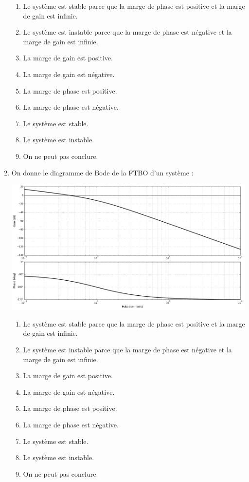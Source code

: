 \documentclass[10pt,fleqn]{article} %
\begin{document}
\begin{multicols}{2}
\begin{enumerate}
\begin{center}
\end{center}
\begin{enumerate}
\item Le système est stable parce que la marge de phase est positive et la marge de gain est infinie.
\item Le système est instable parce que la marge de phase est négative et la marge de gain est infinie.
\item La marge de gain est positive.
\item La marge de gain est négative.
\item La marge de phase est positive.
\item La marge de phase est négative.
\item Le système est stable.
\item Le système est instable.
\item On ne peut pas conclure. %
\end{enumerate}

\item On donne le diagramme de Bode de la FTBO d'un système : 
\begin{center}
\includegraphics[width=\linewidth]{images/img_04}
\end{center}
\begin{enumerate}
\item Le système est stable parce que la marge de phase est positive et la marge de gain est infinie.
\item Le système est instable parce que la marge de phase est négative et la marge de gain est infinie.
\item La marge de gain est positive. %
\item La marge de gain est négative. %
\item La marge de phase est positive. %
\item La marge de phase est négative.
\item Le système est stable. %
\item Le système est instable.
\item On ne peut pas conclure. %
\end{enumerate}
\end{enumerate}


\end{multicols}
\end{document}
